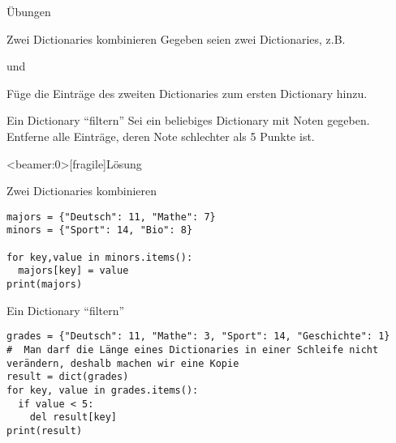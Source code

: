 \begin{frame}{Übungen}

\begin{block}{Zwei Dictionaries kombinieren}
	\vspace{2pt}
Gegeben seien zwei Dictionaries, z.B.  


und 


Füge die Einträge des zweiten Dictionaries zum ersten Dictionary hinzu. 
\end{block}

\pause 

\vspace{12pt}

\begin{block}{Ein Dictionary \enquote{filtern}}
\vspace{2pt}
Sei ein beliebiges Dictionary mit Noten gegeben. Entferne alle Einträge, deren Note schlechter als 5 Punkte ist. 
\end{block}
\end{frame}


\begin{frame}<beamer:0>[fragile]{Lösung}

\begin{solutionblock}{Zwei Dictionaries kombinieren}
\begin{verbatim}
majors = {"Deutsch": 11, "Mathe": 7}
minors = {"Sport": 14, "Bio": 8}

for key,value in minors.items():
  majors[key] = value
print(majors)
\end{verbatim}
\end{solutionblock}

\vspace{12pt}

\begin{solutionblock}{Ein Dictionary \enquote{filtern}}
\begin{verbatim}
grades = {"Deutsch": 11, "Mathe": 3, "Sport": 14, "Geschichte": 1}
#  Man darf die Länge eines Dictionaries in einer Schleife nicht verändern, deshalb machen wir eine Kopie
result = dict(grades)
for key, value in grades.items():
  if value < 5:
    del result[key]
print(result)
\end{verbatim}
\end{solutionblock}

\end{frame}


